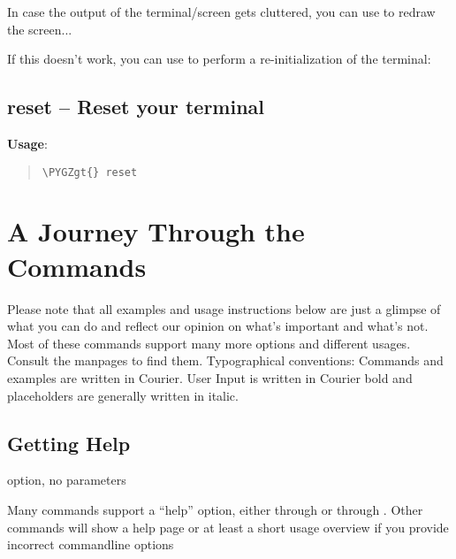 \documentclass[a4paper,11pt,english]{sphinxmanual}
\def\PYGZgt{\char`\>}
\begin{document}
In case the output of the terminal/screen gets cluttered, you can use  to redraw the screen...

If this doesn't work, you can use  to perform a re-initialization of the terminal:


\subsection{reset – Reset your terminal}
\label{introduction:reset-reset-your-terminal}
\textbf{Usage}:  
\begin{quote}

\begin{Verbatim}[frame=single, rulecolor=\color{lightgray}, fontfamily=courier, commandchars=\\\{\}]
\PYGZgt{} reset
\end{Verbatim}
\end{quote}


\section{A Journey Through the Commands}
\label{introduction:a-journey-through-the-commands}
Please note that all examples and usage instructions below are just a glimpse of what you can do and reflect our opinion on what’s important and what’s not. Most of these commands support many more options and different usages. Consult the manpages to find them.
Typographical conventions: Commands and examples are written in Courier.  User Input is written in Courier bold and placeholders are generally written in italic.


\subsection{Getting Help}
\label{introduction:getting-help}\label{introduction:help}
 option, no parameters

Many commands support a “help” option, either through  or through .
Other commands will show a help page or at least a short usage overview if you provide incorrect commandline options
\end{document}
